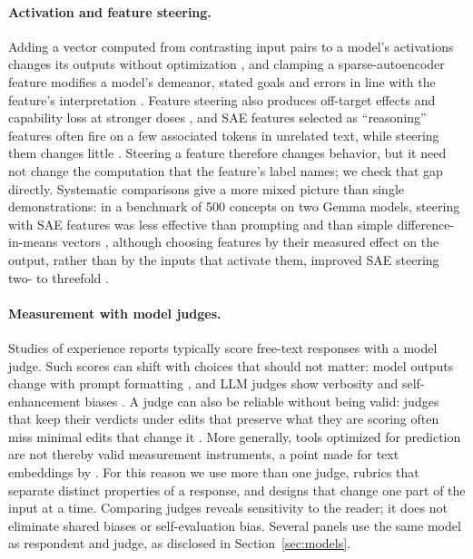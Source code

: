 \documentclass[11pt]{article}
\begin{document}
\paragraph{Activation and feature steering.}
Adding a vector computed from contrasting input pairs to a model's
activations changes its outputs without optimization
\citep{turner2023activation,rimsky2024caa}, and clamping a
sparse-autoencoder feature modifies a model's demeanor, stated goals and
errors in line with the feature's interpretation \citep{templeton2024scaling}.
Feature steering also produces off-target effects and capability loss at
stronger doses \citep{durmus2024steering}, and SAE features selected as
``reasoning'' features often fire on a few associated tokens in unrelated
text, while steering them changes little \citep{ma2026sparse}. Steering a feature therefore
changes behavior, but it need not change the computation that the feature's
label names; we check that gap directly. Systematic comparisons give a more
mixed picture than single demonstrations: in a benchmark of 500 concepts on
two Gemma models, steering with SAE features was less effective than
prompting and than simple difference-in-means vectors \citep{wu2025axbench},
although choosing features by their measured effect on the output, rather
than by the inputs that activate them, improved SAE steering two- to
threefold \citep{arad2025steering}.

\paragraph{Measurement with model judges.}
Studies of experience reports typically score free-text responses with a
model judge. Such scores can shift with choices that should not matter:
model outputs change with prompt formatting
\citep{sclar2024prompt_sensitivity}, and LLM judges show verbosity and
self-enhancement biases \citep{zheng2023llmjudge}. A judge can also be
reliable without being valid: judges that keep their verdicts under edits
that preserve what they are scoring often miss minimal edits that change it
\citep{chen2026judgeconstruct}. More generally, tools
optimized for prediction are not thereby valid measurement instruments, a
point made for text embeddings by \citet{plisiecki2026gap}. For this reason we use
more than one judge, rubrics that separate distinct properties of a response,
and designs that change one part of the input at a time. Comparing judges
reveals sensitivity to the reader; it does not eliminate shared biases or
self-evaluation bias. Several panels use the same model as respondent and
judge, as disclosed in Section~\ref{sec:models}.
\end{document}
